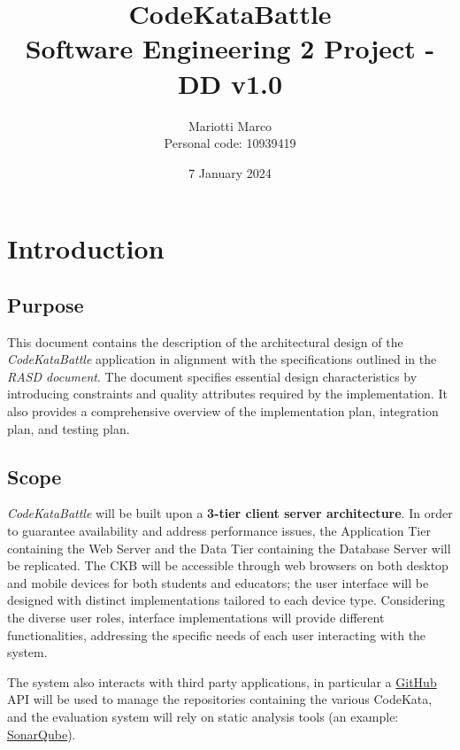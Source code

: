 \documentclass[a4paper, 11pt, titlepage]{article}
\title{
    CodeKataBattle\\
    \large Software Engineering 2 Project - DD v1.0
}
\author{
  Mariotti Marco\\
  Personal code: 10939419
}
\date{7 January 2024}
\begin{document}
\maketitle

\tableofcontents

\newpage

\section{Introduction}

\subsection{Purpose}
This document contains the description of the architectural design of the \textit{CodeKataBattle} application in alignment with the specifications outlined in the \textit{RASD document}. The document specifies essential design characteristics by introducing constraints and quality attributes required by the implementation. It also provides a comprehensive overview of the implementation plan, integration plan, and testing plan.

\subsection{Scope}

\textit{CodeKataBattle} will be built upon a \textbf{3-tier client server architecture}. In order to guarantee availability and address performance issues, the Application Tier containing the Web Server and the Data Tier containing the Database Server will be replicated. The CKB will be accessible through web browsers on both desktop and mobile devices for both students and educators; the user interface will be designed with distinct implementations tailored to each device type. Considering the diverse user roles, interface implementations will provide different functionalities, addressing the specific needs of each user interacting with the system.

The system also interacts with third party applications, in particular a \href{https://github.com/}{GitHub} API will be used to manage the repositories containing the various CodeKata, and the evaluation system will rely on static analysis tools (an example: \href{https://www.sonarsource.com/products/sonarqube/}{SonarQube}).
\end{document}
